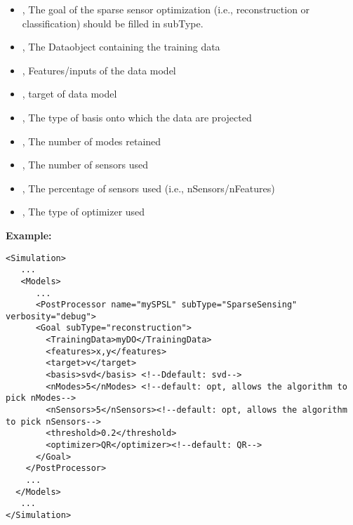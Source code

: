 \begin{itemize}
	\item {}, The goal of the sparse sensor optimization (i.e., reconstruction or classification) should be filled in subType.
	\item {}, The Dataobject containing the training data
	\item {}, Features/inputs of the data model
	\item {}, target of data model
	\item {}, The type of basis onto which the data are projected
	\item {}, The number of modes retained
	\item {}, The number of sensors used
	\item {}, The percentage of sensors used (i.e., nSensors/nFeatures)
	\item {}, The type of optimizer used
\end{itemize}

\textbf{Example:}
\begin{lstlisting}[style=XML]
<Simulation>
   ...
   <Models>
      ...
      <PostProcessor name="mySPSL" subType="SparseSensing" verbosity="debug">
      <Goal subType="reconstruction">
        <TrainingData>myDO</TrainingData>
        <features>x,y</features>
        <target>v</target>
        <basis>svd</basis> <!--Ddefault: svd-->
        <nModes>5</nModes> <!--default: opt, allows the algorithm to pick nModes-->
        <nSensors>5</nSensors><!--default: opt, allows the algorithm to pick nSensors-->
        <threshold>0.2</threshold>
        <optimizer>QR</optimizer><!--default: QR-->
      </Goal>
    </PostProcessor>
    ...
  </Models>
   ...
</Simulation>
\end{lstlisting}
